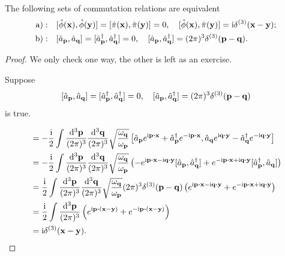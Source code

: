 \documentclass[a4paper,11pt]{article}
\begin{document}
	\begin{thm}
		The following sets of commutation relations are equivalent
		\begin{align}
			\mathrm{a):} & \quad[\hat \phi(\vb x),\hat \phi(\vb y)] = [\hat \pi(\vb x), \hat \pi(\vb y)] = 0, \quad [\hat \phi(\vb x), \hat \pi(\vb y)] = \mathrm{i} \delta^{(3)}(\vb x - \vb y);\\
			\mathrm{b):} & \quad[\hat a _{\vb p}, \hat a _{\vb q}] = [\hat a^\dagger _{\vb p}, \hat a^\dagger _{\vb q}] = 0, \quad [\hat a _{\vb p}, \hat a^\dagger _{\vb q}] = (2 \pi)^3 \delta ^{(3)}(\vb p - \vb q).
		\end{align}
	\end{thm}
	\begin{proof}
		We only check one way, the other is left as an exercise.

		Suppose
		\[
			[\hat a _{\vb p}, \hat a _{\vb q}] = [\hat a^\dagger _{\vb p}, \hat a^\dagger _{\vb q}] = 0, \quad [\hat a _{\vb p}, \hat a^\dagger _{\vb q}] = (2 \pi)^3 \delta ^{(3)}(\vb p - \vb q)
		\]
		is true.

		\begin{align*}
			[\hat \phi(\vb x), \hat \pi(\vb y)] & = - \frac{\mathrm{i}}{2} \int \ddk{\vb p}{3} \ddk{\vb q}{3} \sqrt{\frac{\omega _{\vb q}}{\omega _{\vb p}}} \left[ \hat a _{\vb p}e ^{\mathrm{i} \vb p \vdot \vb x} + \hat a^\dagger _{\vb p} e ^{-\mathrm{i}\vb p \vdot \vb x}, \hat a _{\vb q} e ^{\mathrm{i} \vb q \vdot \vb y} - \hat a^\dagger _{\vb q} e ^{- \mathrm{i} \vb q \vdot \vb y} \right]\\
			& = - \frac{\mathrm{i}}{2} \int \ddk{\vb p}{3} \ddk{\vb q}{3} \sqrt{\frac{\omega _{\vb q}}{\omega _{\vb p}}} \left( - e ^{\mathrm{i} \vb p \vdot \vb x - \mathrm{i} \vb q \vdot \vb y} [\hat a _{\vb p}, \hat a^\dagger _{\vb q}] + e ^{-\mathrm{i} \vb p \vdot \vb x + \mathrm{i} \vb q \vdot \vb y} [\hat a^\dagger _{\vb p}, \hat a _{\vb q}] \right)\\
			& = \frac{\mathrm{i}}{2} \int \ddk{\vb p}{3} \ddk{\vb q}{3} \sqrt{\frac{\omega _{\vb q}}{\omega _{\vb p}}}(2 \pi)^3 \delta ^{(3)} (\vb p - \vb q) \left( e ^{\mathrm{i} \vb p \vdot \vb x - \mathrm{i} \vb q \vdot \vb y} + e ^{-\mathrm{i} \vb p \vdot \vb x + \mathrm{i} \vb q \vdot \vb y} \right)\\
			& = \frac{\mathrm{i}}{2}\int \ddk{\vb p}{3} \left( e ^{\mathrm{i} \vb p \vdot (\vb x - \vb y)} + e ^{-\mathrm{i} \vb p \vdot (\vb x - \vb y)} \right)\\
			& = \mathrm{i} \delta ^{(3)}(\vb x - \vb y).
		\end{align*}
	\end{proof}
\end{document}

